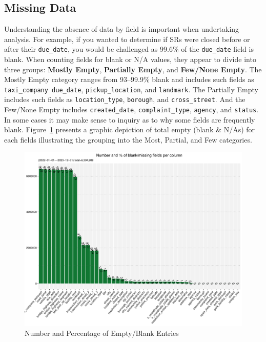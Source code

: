 \documentclass[linenumber]{jdsart}
\begin{document}
\subsection{Missing Data}
\label{sec:blanks}
Understanding the absence of data by field is important 
when undertaking analysis. For example, if you wanted to 
determine if SRs were closed before or after their
\texttt{due\_date}, you would be challenged as 99.6\% of the
\texttt{due\_date} field is
blank. When counting fields for blank or N/A values, they appear 
to divide into three groups:
\textbf{Mostly Empty}, \textbf{Partially Empty}, 
and \textbf{Few/None Empty}. 
The Mostly Empty category ranges from 93--99.9\% blank 
and includes such fields as
\texttt{taxi\_company due\_date},
\texttt{pickup\_location}, and \texttt{landmark}.
The Partially Empty includes such fields as
\texttt{location\_type}, \texttt{borough}, 
and \texttt{cross\_street}. And the Few/None Empty includes
\texttt{created\_date}, \texttt{complaint\_type},
\texttt{agency}, and \texttt{status}. In some cases it may make
sense to inquiry as to why some fields are frequently blank.
Figure~\ref{fig:blank_fields} presents a graphic 
depiction of total empty (blank \& N/As) for each fields illustrating
the grouping into the Most, Partial, and Few categories.


\begin{figure}[tbp]
	\centering
  	\includegraphics[width=\textwidth]{BlankFields.pdf}
	\caption{Number and Percentage of Empty/Blank Entries}
	\label{fig:blank_fields}
\end{figure}
\end{document}
